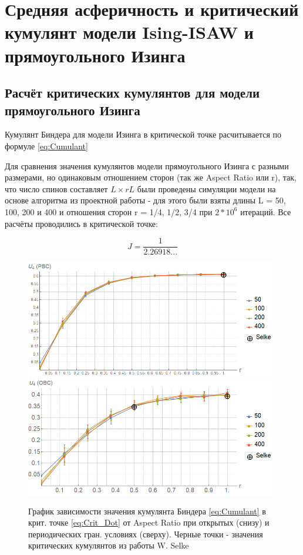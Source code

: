 \section{Средняя асферичность и критический кумулянт модели Ising-ISAW и прямоугольного Изинга}


\subsection{Расчёт критических кумулянтов для модели прямоугольного Изинга}

Кумулянт Биндера для модели Изинга в критической точке расчитывается по формуле \ref{eq:Cumulant}

Для сравнения значения кумулянтов модели прямоугольного Изинга с разными размерами, но одинаковым отношением сторон (так же Aspect Ratio или r), так, что число спинов составляет $L \times rL$ были проведены симуляции модели на основе алгоритма из проектной работы \cite{web:SchroedingercatRepos} - для этого были взяты длины L = 50, 100, 200 и 400 и отношения сторон r = 1/4, 1/2, 3/4 при $2 * 10^{6}$ итераций. Все расчёты проводились в критической точке\cite{selke2006critical}:

\begin{equation}
\label{eq:Crit_Dot}
J = \frac{1}{2.26918...}
\end{equation}



\begin{figure}[!h]
    \centering
    \includegraphics[width=110mm]{Sections/Images/CumulantPBC.png}
    \vfill
    \includegraphics[width=110mm]{Sections/Images/CumulantOBC.png}
    \caption{График зависимости значения кумулянта Биндера \eqref{eq:Cumulant} в крит. точке \eqref{eq:Crit_Dot} от Aspect Ratio при открытых (снизу) и периодических гран. условиях (сверху). Черные точки - значения критических кумулянтов из работы W. Selke\cite{selke2006critical}}
    \label{fig:CumulOPBC}
\end{figure}

